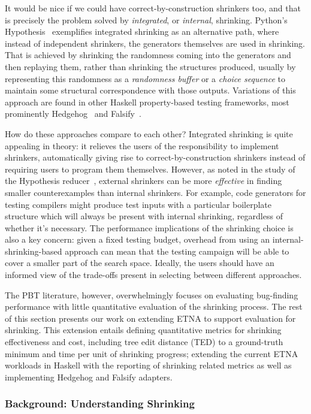 It would be nice if we could have correct-by-construction shrinkers too, and that is
precisely the problem solved by \emph{integrated}, or \emph{internal}, shrinking.
Python's Hypothesis~\cite{Hypothesis} exemplifies integrated shrinking as an
alternative path, where instead of independent shrinkers, the generators themselves are
used in shrinking. That is achieved by shrinking the randomness coming into the
generators and then replaying them, rather than shrinking the structures produced,
usually by representing this randomness as a \emph{randomness buffer} or a \emph{choice
  sequence} to maintain some structural correspondence with those outputs. Variations of
this approach are found in other Haskell property-based testing frameworks, most
prominently Hedgehog~\cite{Hedgehog} and Falsify~\cite{falsify}.

How do these approaches compare to each other? Integrated shrinking is quite appealing
in theory: it relieves the users of the responsibility to implement shrinkers,
automatically giving rise to correct-by-construction shrinkers instead of requiring
users to program them themselves. However, as noted in the study of the Hypothesis
reducer~\cite{HypothesisShrinking}, external shrinkers can be more \emph{effective} in
finding smaller counterexamples than internal shrinkers. For example, code generators
for testing compilers might produce test inputs with a particular boilerplate structure
which will always be present with internal shrinking, regardless of whether it's
necessary. The performance implications of the shrinking choice is also a key concern:
given a fixed testing budget, overhead from using an internal-shrinking-based approach
can mean that the testing campaign will be able to cover a smaller part of the search
space. Ideally, the users should have an informed view of the trade-offs present in
selecting between different approaches.

The PBT literature, however, overwhelmingly focuses on evaluating bug-finding
performance with little quantitative evaluation of the shrinking process. The rest of
this section presents our work on extending ETNA to support evaluation for shrinking.
This extension entails defining quantitative metrics for shrinking effectiveness and
cost, including tree edit distance (TED) to a ground-truth minimum and time per unit of
shrinking progress; extending the current ETNA workloads in Haskell with the reporting
of shrinking related metrics as well as implementing Hedgehog and Falsify adapters.

\subsubsection{Background: Understanding Shrinking}
\label{shrinkeval:sec:technical}

